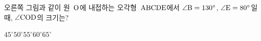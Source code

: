 \noindent\begin{minipage}[t]{0.58\linewidth}\vspace{0pt}\raggedright 오른쪽 그림과 같이 원~$\mathrm{O}$에 내접하는 오각형~$\mathrm{ABCDE}$에서 $\angle\mathrm{B}=130^\circ$, $\angle\mathrm{E}=80^\circ$일 때, $\angle\mathrm{COD}$의 크기는?\end{minipage}\hfill\begin{minipage}[t]{0.4\linewidth}\vspace{0pt}\centering \resizebox{\ifdim\width>\linewidth\linewidth\else\width\fi}{!}{}\end{minipage}\par
\begin{choicesii}{$45^\circ$}{$50^\circ$}{$55^\circ$}{$60^\circ$}{$65^\circ$}\end{choicesii}
